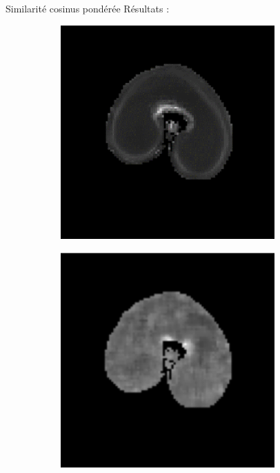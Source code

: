 \documentclass[10pt]{beamer}
\begin{document}
\begin{frame}{Similarité cosinus pondérée}
  Résultats :

    \begin{figure}[ht]
    \centering
    \begin{subfigure}[t]{0.31\textwidth}
      \centering
      \includegraphics[width=0.9\textwidth]{fig/mri_slice8_250}
      \caption{}
      \label{subfig:mri_slice8_250}
    \end{subfigure}%
    \begin{subfigure}[t]{0.31\textwidth}
      \centering
      \includegraphics[width=0.9\textwidth]{fig/cosine_median}

\end{subfigure}
\end{figure}
\end{frame}
\end{document}
